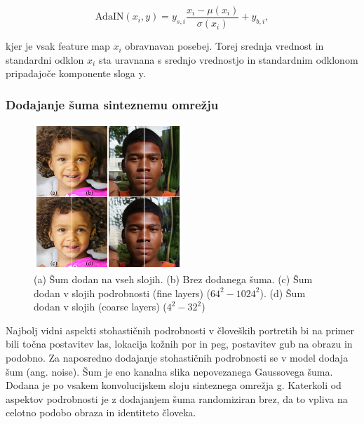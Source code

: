 \documentclass[a4paper,12pt,openright]{book}
\begin{document}
\begin{equation}
\text{AdaIN}(x_{i},y) = y_{s,i} \frac{x_{i} - \mu(x_{i})}{\sigma(x_{i})} + y_{b,i},
\end{equation}

kjer je vsak feature map $x_{i}$ obravnavan posebej. Torej srednja vrednost in standardni odklon $x_{i}$ sta uravnana s srednjo vrednostjo in standardnim odklonom pripadajoče komponente sloga y.


\subsubsection{Dodajanje šuma sinteznemu omrežju}

\begin{figure}[htb]
\begin{center}
  \includegraphics[width=0.5\textwidth]{images/stylegan_noise.png}
\end{center}
  \caption{(a) Šum dodan na vseh slojih. (b) Brez dodanega šuma. (c) Šum dodan v slojih podrobnosti (fine layers) ($64^2 - 1024^2$). (d) Šum dodan v slojih (coarse layers)  ($4^2 - 32^2$)}
  \label{AdaIN}
\end{figure}

Najbolj vidni aspekti stohastičnih podrobnosti v človeških portretih bi na primer bili točna postavitev las, lokacija kožnih por in peg, postavitev gub na obrazu in podobno. Za naposredno dodajanje stohastičnih podrobnosti se v model dodaja šum (ang. noise). Šum je eno kanalna slika nepovezanega Gaussovega šuma. Dodana je po vsakem konvolucijskem sloju sinteznega omrežja g. Katerkoli od aspektov podrobnosti je z dodajanjem šuma randomiziran brez, da to vpliva na celotno podobo obraza in identiteto človeka.
\end{document}
